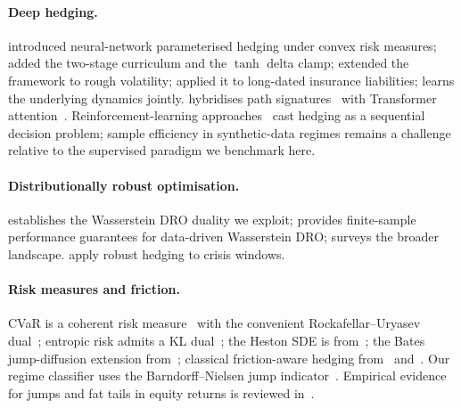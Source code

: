 \documentclass[11pt]{article}
\begin{document}
\paragraph{Deep hedging.}
\citet{buehler2019deep} introduced neural-network parameterised hedging under convex risk measures; \citet{kozyra2019deep} added the two-stage curriculum and the $\tanh$ delta clamp; \citet{horvath2021deep} extended the framework to rough volatility; \citet{carbonneau2021deep} applied it to long-dated insurance liabilities; \citet{wiese2020deep} learns the underlying dynamics jointly.  \citet{tong2023sigformer} hybridises path signatures~\citep{lyons1998differential,kidger2020signatory} with Transformer attention~\citep{vaswani2017attention,zhou2021informer}.  Reinforcement-learning approaches~\citep{kolm2019dynamic, cao2021deep, haarnoja2018soft, neagu2025drl, pickard2025rl, huang2025sac} cast hedging as a sequential decision problem; sample efficiency in synthetic-data regimes remains a challenge relative to the supervised paradigm we benchmark here.

\paragraph{Distributionally robust optimisation.}
\citet{blanchet2019quantifying} establishes the Wasserstein DRO duality we exploit; \citet{esfahani2018data} provides finite-sample performance guarantees for data-driven Wasserstein DRO; \citet{rahimian2019distributionally} surveys the broader landscape.  \citet{lutkebohmert2019robust} apply robust hedging to crisis windows.

\paragraph{Risk measures and friction.}
CVaR is a coherent risk measure~\citep{artzner1999coherent} with the convenient Rockafellar--Uryasev dual~\citep{rockafellar2000optimization}; entropic risk admits a KL dual~\citep{follmer2002convex}; the Heston SDE is from~\citet{heston1993closed}; the Bates jump-diffusion extension from~\citet{bates1996jumps}; classical friction-aware hedging from~\citet{leland1985option} and~\citet{whalley1997asymptotic}.  Our regime classifier uses the Barndorff--Nielsen jump indicator~\citep{barndorffnielsen2002econometric}.  Empirical evidence for jumps and fat tails in equity returns is reviewed in~\citet{cont2001empirical}.

\end{document}
